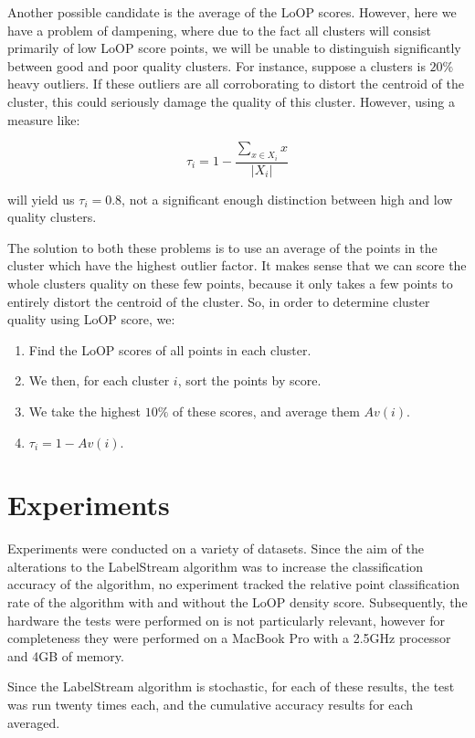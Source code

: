 \documentclass[12pt,a4paper,oneside]{report}
\begin{document}
Another possible candidate is the average of the LoOP scores. However, here we have a problem of dampening, where due to the fact all clusters will consist primarily of low LoOP score points, we will be unable to distinguish significantly between good and poor quality clusters. For instance, suppose a clusters is $20\%$ heavy outliers. If these outliers are all corroborating to distort the centroid of the cluster, this could seriously damage the quality of this cluster. However, using a measure like:

\[\tau_i = 1- \frac{\sum_{x \in X_i}x}{|X_i|}\]

will yield us $\tau_i = 0.8$, not a significant enough distinction between high and low quality clusters. 

The solution to both these problems is to use an average of the points in the cluster which have the highest outlier factor. It makes sense that we can score the whole clusters quality on these few points, because it only takes a few points to entirely distort the centroid of the cluster. So, in order to determine cluster quality using LoOP score, we:

\begin{enumerate}
\item Find the LoOP scores of all points in each cluster. 
\item We then, for each cluster $i$, sort the points by score. 
\item We take the highest $10\%$ of these scores, and average them $Av(i)$. 
\item $\tau_i = 1 - Av(i)$. 
\end{enumerate}
 

\section{Experiments}
Experiments were conducted on a variety of datasets. Since the aim of the alterations to the LabelStream algorithm was to increase the classification accuracy of the algorithm, no experiment tracked the relative point classification rate of the algorithm with and without the LoOP density score. Subsequently, the hardware the tests were performed on is not particularly relevant, however for completeness they were performed on a MacBook Pro with a 2.5GHz processor and 4GB of memory. 

Since the LabelStream algorithm is stochastic, for each of these results, the test was run twenty times each, and the cumulative accuracy results for each averaged. 
\end{document}
